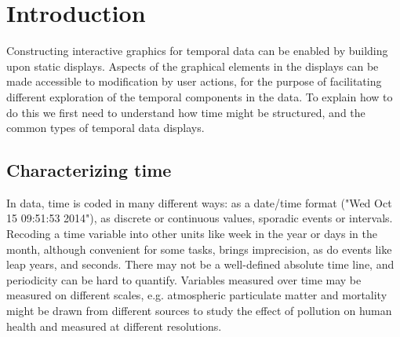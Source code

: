 \documentclass[12pt]{article}
\begin{document}

\section{Introduction}

Constructing interactive graphics for temporal data can be enabled by building upon static displays. Aspects of the graphical elements in the displays can be made accessible to modification by user actions, for the purpose of facilitating different exploration of the temporal components in the data. To explain how to do this we first need to understand how time might be structured, and the common types of temporal data displays.



\subsection{Characterizing time}

In data, time is coded in many different ways: as a date/time format ("Wed Oct 15 09:51:53 2014"), as discrete or continuous values, sporadic events or intervals. Recoding a time variable into other units like week in the year or days in the month, although convenient for some tasks, brings imprecision, as do events like leap years, and seconds. There may not be a well-defined absolute time line, and periodicity can be hard to quantify. Variables measured over time may be measured on different scales, e.g. atmospheric particulate matter and mortality might be drawn from different sources to study the effect of pollution on human health and measured at different resolutions.

\end{document}
